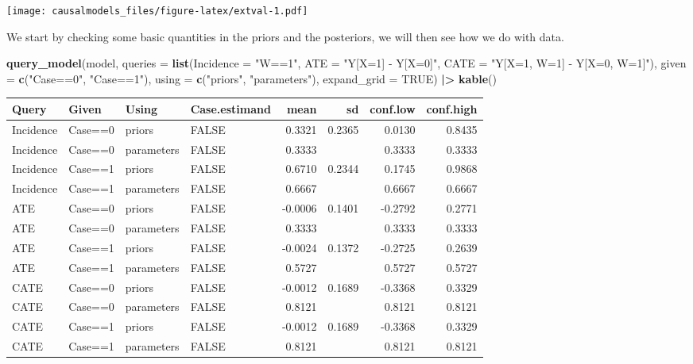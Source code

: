 \documentclass[
  12pt,
]{book}
\newenvironment{Shaded}{\begin{snugshade}}{\end{snugshade}}
\newcommand{\AttributeTok}[1]{\textcolor[rgb]{0.13,0.29,0.53}{#1}}
\newcommand{\ConstantTok}[1]{\textcolor[rgb]{0.56,0.35,0.01}{#1}}
\newcommand{\FunctionTok}[1]{\textcolor[rgb]{0.13,0.29,0.53}{\textbf{#1}}}
\newcommand{\NormalTok}[1]{#1}
\newcommand{\SpecialCharTok}[1]{\textcolor[rgb]{0.81,0.36,0.00}{\textbf{#1}}}
\newcommand{\StringTok}[1]{\textcolor[rgb]{0.31,0.60,0.02}{#1}}
\begin{document}
\texttt{[image: causalmodels\_files/figure-latex/extval-1.pdf]}

We start by checking some basic quantities in the priors and the posteriors, we will then see how we do with data.

\begin{Shaded}
\begin{Highlighting}[]
\FunctionTok{query\_model}\NormalTok{(model,}
            \AttributeTok{queries =} \FunctionTok{list}\NormalTok{(}\AttributeTok{Incidence =} \StringTok{"W==1"}\NormalTok{, }
                           \AttributeTok{ATE =} \StringTok{"Y[X=1] {-} Y[X=0]"}\NormalTok{, }
                           \AttributeTok{CATE =} \StringTok{"Y[X=1, W=1] {-} Y[X=0, W=1]"}\NormalTok{),}
            \AttributeTok{given =} \FunctionTok{c}\NormalTok{(}\StringTok{"Case==0"}\NormalTok{, }\StringTok{"Case==1"}\NormalTok{),}
            \AttributeTok{using =} \FunctionTok{c}\NormalTok{(}\StringTok{"priors"}\NormalTok{, }\StringTok{"parameters"}\NormalTok{), }\AttributeTok{expand\_grid =} \ConstantTok{TRUE}\NormalTok{) }\SpecialCharTok{|\textgreater{}} \FunctionTok{kable}\NormalTok{()}
\end{Highlighting}
\end{Shaded}

\begin{tabular}{l|l|l|l|r|r|r|r}
\hline
Query & Given & Using & Case.estimand & mean & sd & conf.low & conf.high\\
\hline
Incidence & Case==0 & priors & FALSE & 0.3321 & 0.2365 & 0.0130 & 0.8435\\
\hline
Incidence & Case==0 & parameters & FALSE & 0.3333 &  & 0.3333 & 0.3333\\
\hline
Incidence & Case==1 & priors & FALSE & 0.6710 & 0.2344 & 0.1745 & 0.9868\\
\hline
Incidence & Case==1 & parameters & FALSE & 0.6667 &  & 0.6667 & 0.6667\\
\hline
ATE & Case==0 & priors & FALSE & -0.0006 & 0.1401 & -0.2792 & 0.2771\\
\hline
ATE & Case==0 & parameters & FALSE & 0.3333 &  & 0.3333 & 0.3333\\
\hline
ATE & Case==1 & priors & FALSE & -0.0024 & 0.1372 & -0.2725 & 0.2639\\
\hline
ATE & Case==1 & parameters & FALSE & 0.5727 &  & 0.5727 & 0.5727\\
\hline
CATE & Case==0 & priors & FALSE & -0.0012 & 0.1689 & -0.3368 & 0.3329\\
\hline
CATE & Case==0 & parameters & FALSE & 0.8121 &  & 0.8121 & 0.8121\\
\hline
CATE & Case==1 & priors & FALSE & -0.0012 & 0.1689 & -0.3368 & 0.3329\\
\hline
CATE & Case==1 & parameters & FALSE & 0.8121 &  & 0.8121 & 0.8121\\
\hline
\end{tabular}
\end{document}
